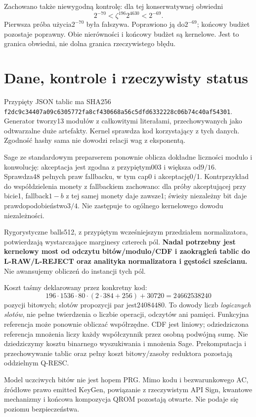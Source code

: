\documentclass[11pt,a4paper]{article}
\newcommand{\code}[1]{\nolinkurl{#1}}
\begin{document}
Zachowano także niewygodną kontrolę: dla tej konserwatywnej obwiedni
\[
 2^{-70}<\zeta^{196}2^{4630}<2^{-69}.
\]
Pierwsza próba użycia$2^{-70}$ była fałszywa. Poprawiono ją do$2^{-69}$;
końcowy budżet pozostaje poprawny. Obie nierówności i końcowy budżet
są kernelowe. Jest to granica obwiedni, nie dolna granica rzeczywistego błędu.

\section{Dane, kontrole i rzeczywisty status}
Przypięty JSON tablic ma SHA256
\code{f2dc9c34407a09c6305772fa8cf430668a56c5dfd6332228c06b74c40af54301}.
Generator tworzy13 modułów z całkowitymi literałami, przechowywanych jako
odtwarzalne duże artefakty. Kernel sprawdza kod korzystający z tych danych.
Zgodność hashy sama nie dowodzi relacji wag z eksponentą.

Sage ze standardowym preparserem ponownie oblicza dokładne liczności
modulo i konwolucję: akceptacja jest zgodna z przypiętym003 i większa od$9/16$.
Sprawdza48 pełnych praw fallbacku, w tym cap0 i akceptację0/1.
Kontrprzykład do współdzielenia monety z fallbackiem zachowano: dla próby
akceptującej przy bicie1, fallback$1-b$ z tej samej monety daje zawsze1;
świeży niezależny bit daje prawdopodobieństwo$3/4$.
Nie zastępuje to ogólnego kernelowego dowodu niezależności.

Rygorystyczne balls512, z przypiętym wcześniejszym przedziałem normalizatora,
potwierdzają wystarczające marginesy czterech pól. \textbf{Nadal potrzebny
jest kernelowy most od odczytu bitów/modulo/CDF i zaokrągleń tablic do
L-RAW/L-REJECT oraz analityka normalizatora i gęstości sześcianu.}
Nie awansujemy obliczeń do instancji tych pól.

Koszt taśmy deklarowany przez konkretny kod:
\[
 196\cdot1536\cdot80\cdot(2\cdot384+256)+30720=24662538240
\]
pozycji bitowych; slotów propozycji par jest$24084480$.
To dowody liczb \emph{logicznych slotów}, nie pełne twierdzenia o liczbie
operacji, odczytów ani pamięci. Funkcyjna referencja może ponownie obliczać
współrzędne. CDF jest liniowy; odziedziczona referencja mnożenia liczy każdy
współczynnik przez osobną podwójną sumę. Nie dziedziczymy kosztu binarnego
wyszukiwania i mnożenia Sage. Prekomputacja i przechowywanie tablic oraz
pełny koszt bitowy/zasoby reduktora pozostają oddzielnym Q-RESC.

Model uczciwych bitów nie jest hopem PRG. Mimo kodu i bezwarunkowego AC,
źródłowe prawo emitted KeyGen, powiązanie z rzeczywistym API Sign,
kwantowe mechanizmy i końcowa kompozycja QROM pozostają otwarte.
Nie podaje się poziomu bezpieczeństwa.
\end{document}
